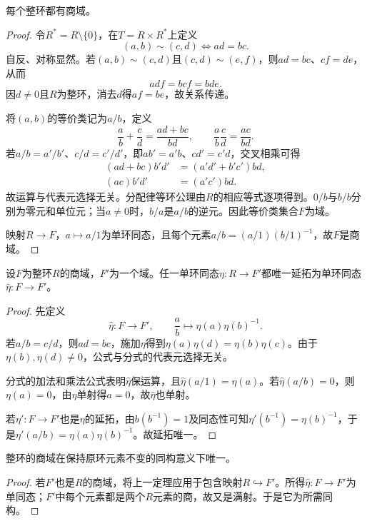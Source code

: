 \begin{theorem}\label{p2:fraction-field}
每个整环都有商域。
\end{theorem}
\begin{proof}
令$R^*=R\setminus\{0\}$，在$T=R\times R^*$上定义
\[
(a,b)\sim(c,d)\iff ad=bc.
\]
自反、对称显然。若$(a,b)\sim(c,d)$且$(c,d)\sim(e,f)$，则$ad=bc$、$cf=de$，从而
\[
adf=bcf=bde.
\]
因$d\ne0$且$R$为整环，消去$d$得$af=be$，故关系传递。

将$(a,b)$的等价类记为$a/b$，定义
\[
\frac ab+\frac cd=\frac{ad+bc}{bd},\qquad
\frac ab\frac cd=\frac{ac}{bd}.
\]
若$a/b=a'/b'$、$c/d=c'/d'$，即$ab'=a'b$、$cd'=c'd$，交叉相乘可得
\begin{align*}
(ad+bc)b'd'&=(a'd'+b'c')bd,\\
(ac)b'd'&=(a'c')bd.
\end{align*}
故运算与代表元选择无关。分配律等环公理由$R$的相应等式逐项得到。$0/b$与$b/b$分别为零元和单位元；当$a\ne0$时，$b/a$是$a/b$的逆元。因此等价类集合$F$为域。

映射$R\to F$，$a\mapsto a/1$为单环同态，且每个元素$a/b=(a/1)(b/1)^{-1}$，故$F$是商域。

\end{proof}

\begin{theorem}\label{p2:fraction-field-extension}
设$F$为整环$R$的商域，$F'$为一个域。任一单环同态$\eta:R\to F'$都唯一延拓为单环同态$\widehat\eta:F\to F'$。
\end{theorem}
\begin{proof}
先定义
\[
\widehat\eta:F\to F',\qquad \frac ab\longmapsto\eta(a)\eta(b)^{-1}.
\]
若$a/b=c/d$，则$ad=bc$，施加$\eta$得到$\eta(a)\eta(d)=\eta(b)\eta(c)$。由于$\eta(b),\eta(d)\ne0$，公式与分式的代表元选择无关。

分式的加法和乘法公式表明$\widehat\eta$保运算，且$\widehat\eta(a/1)=\eta(a)$。若$\widehat\eta(a/b)=0$，则$\eta(a)=0$，由$\eta$单射得$a=0$，故$\widehat\eta$也单射。

若$\eta':F\to F'$也是$\eta$的延拓，由$b(b^{-1})=1$及同态性可知$\eta'(b^{-1})=\eta(b)^{-1}$，于是$\eta'(a/b)=\eta(a)\eta(b)^{-1}$。故延拓唯一。
\end{proof}

\begin{corollary}
整环的商域在保持原环元素不变的同构意义下唯一。
\end{corollary}
\begin{proof}
若$F'$也是$R$的商域，将上一定理应用于包含映射$R\hookrightarrow F'$。所得$\widehat\eta:F\to F'$为单同态；$F'$中每个元素都是两个$R$元素的商，故又是满射。于是它为所需同构。
\end{proof}


